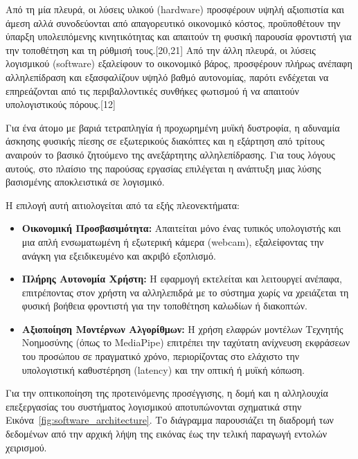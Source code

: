 \documentclass[twoside, a4paper, 11pt]{article}
\begin{document}
Από τη μία πλευρά, οι λύσεις υλικού (hardware) προσφέρουν υψηλή αξιοπιστία και άμεση 
αλλά συνοδεύονται από απαγορευτικό οικονομικό κόστος, προϋποθέτουν την ύπαρξη υπολειπόμενης
κινητικότητας και απαιτούν τη φυσική παρουσία φροντιστή για την τοποθέτηση και τη ρύθμισή τους.[20,21] Από
την άλλη πλευρά, οι λύσεις λογισμικού (software) εξαλείφουν το οικονομικό βάρος, προσφέρουν πλήρως
ανέπαφη αλληλεπίδραση και εξασφαλίζουν υψηλό βαθμό αυτονομίας, παρότι ενδέχεται να επηρεάζονται
από τις περιβαλλοντικές συνθήκες φωτισμού ή να απαιτούν υπολογιστικούς πόρους.[12]

Για ένα άτομο με βαριά τετραπληγία ή προχωρημένη μυϊκή δυστροφία, η αδυναμία άσκησης φυσικής
πίεσης σε εξωτερικούς διακόπτες και η εξάρτηση από τρίτους αναιρούν το βασικό ζητούμενο της ανεξάρτητης αλληλεπίδρασης. Για τους λόγους αυτούς, στο πλαίσιο της παρούσας εργασίας επιλέγεται η
ανάπτυξη μιας λύσης βασισμένης αποκλειστικά σε λογισμικό.

Η επιλογή αυτή αιτιολογείται από τα εξής πλεονεκτήματα:
\begin{itemize}
    \item \textbf{Οικονομική Προσβασιμότητα:} Απαιτείται μόνο ένας τυπικός υπολογιστής και μια απλή ενσωματωμένη ή εξωτερική κάμερα (webcam), εξαλείφοντας την ανάγκη για εξειδικευμένο και ακριβό εξοπλισμό.
    \item \textbf{Πλήρης Αυτονομία Χρήστη:} Η εφαρμογή εκτελείται και λειτουργεί ανέπαφα, επιτρέποντας στον χρήστη να αλληλεπιδρά με το σύστημα χωρίς να χρειάζεται τη φυσική βοήθεια φροντιστή για την τοποθέτηση καλωδίων ή διακοπτών.
    \item \textbf{Αξιοποίηση Μοντέρνων Αλγορίθμων:} Η χρήση ελαφρών μοντέλων Τεχνητής Νοημοσύνης (όπως το MediaPipe) επιτρέπει την ταχύτατη ανίχνευση εκφράσεων του προσώπου σε πραγματικό χρόνο, περιορίζοντας στο ελάχιστο την υπολογιστική καθυστέρηση (latency) και την οπτική ή μυϊκή κόπωση.
\end{itemize}

Για την οπτικοποίηση της προτεινόμενης προσέγγισης, η δομή και η αλληλουχία επεξεργασίας του συστήματος λογισμικού αποτυπώνονται σχηματικά στην Εικόνα~\ref{fig:software_architecture}. Το διάγραμμα παρουσιάζει τη διαδρομή των δεδομένων από την αρχική λήψη της εικόνας έως την τελική παραγωγή εντολών χειρισμού.
\end{document}

